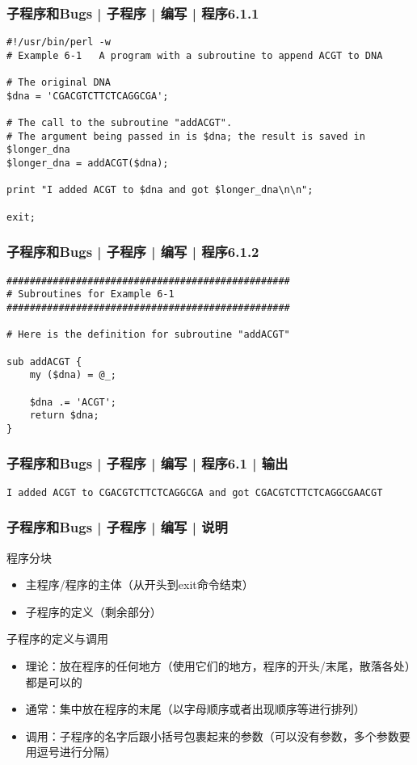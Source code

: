 \begin{frame}[fragile]
  \frametitle{子程序和Bugs | 子程序 | 编写 | 程序6.1.1}
  \vspace{-0.5em}
\begin{lstlisting}
#!/usr/bin/perl -w
# Example 6-1   A program with a subroutine to append ACGT to DNA

# The original DNA
$dna = 'CGACGTCTTCTCAGGCGA';

# The call to the subroutine "addACGT".
# The argument being passed in is $dna; the result is saved in $longer_dna
$longer_dna = addACGT($dna);

print "I added ACGT to $dna and got $longer_dna\n\n";

exit;
\end{lstlisting}
\end{frame}

\begin{frame}[fragile]
  \frametitle{子程序和Bugs | 子程序 | 编写 | 程序6.1.2}
\begin{lstlisting}[firstnumber=15,basicstyle=\small\tt]
#################################################
# Subroutines for Example 6-1
#################################################

# Here is the definition for subroutine "addACGT"

sub addACGT {
    my ($dna) = @_;

    $dna .= 'ACGT';
    return $dna;
}
\end{lstlisting}
\end{frame}

\begin{frame}[fragile]
  \frametitle{子程序和Bugs | 子程序 | 编写 | 程序6.1 | 输出}
\begin{lstlisting}
I added ACGT to CGACGTCTTCTCAGGCGA and got CGACGTCTTCTCAGGCGAACGT
\end{lstlisting}
\end{frame}

\begin{frame}
  \frametitle{子程序和Bugs | 子程序 | 编写 | \alert{说明}}
  \begin{block}{程序分块}
    \begin{itemize}
      \item 主程序/程序的主体（从开头到exit命令结束）
      \item 子程序的定义（剩余部分）
    \end{itemize}
  \end{block}
  \pause
  \begin{block}{子程序的定义与调用}
    \begin{itemize}
      \item 理论：放在程序的任何地方（使用它们的地方，程序的开头/末尾，散落各处）都是可以的
      \item 通常：集中放在程序的末尾（以字母顺序或者出现顺序等进行排列）
      \item 调用：子程序的名字后跟小括号包裹起来的参数（可以没有参数，多个参数要用逗号进行分隔）
    \end{itemize}
  \end{block}
\end{frame}

